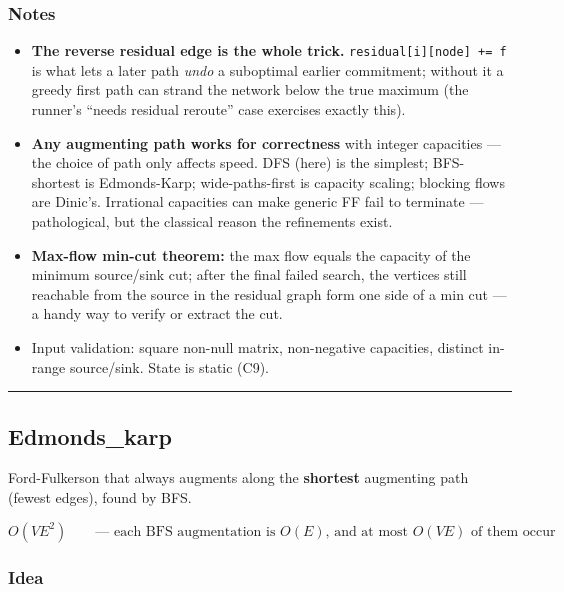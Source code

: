 \documentclass[
  10pt,
  letterpaper,
  onecolumn]{article}
\providecommand{\tightlist}{%
  \setlength{\itemsep}{0pt}\setlength{\parskip}{0pt}}
\begin{document}
\hypertarget{notes-23}{%
\subsubsection{Notes}\label{notes-23}}

\begin{itemize}
\tightlist
\item
  \textbf{The reverse residual edge is the whole trick.}
  \texttt{residual{[}i{]}{[}node{]}\ +=\ f} is what lets a later path
  \emph{undo} a suboptimal earlier commitment; without it a greedy first
  path can strand the network below the true maximum (the runner's
  ``needs residual reroute'' case exercises exactly this).
\item
  \textbf{Any augmenting path works for correctness} with integer
  capacities --- the choice of path only affects speed. DFS (here) is
  the simplest; BFS-shortest is Edmonds-Karp; wide-paths-first is
  capacity scaling; blocking flows are Dinic's. Irrational capacities
  can make generic FF fail to terminate --- pathological, but the
  classical reason the refinements exist.
\item
  \textbf{Max-flow min-cut theorem:} the max flow equals the capacity of
  the minimum source/sink cut; after the final failed search, the
  vertices still reachable from the source in the residual graph form
  one side of a min cut --- a handy way to verify or extract the cut.
\item
  Input validation: square non-null matrix, non-negative capacities,
  distinct in-range source/sink. State is static (C9).
\end{itemize}

\begin{center}\rule{0.5\linewidth}{0.5pt}\end{center}

\hypertarget{edmonds_karp}{%
\subsection{Edmonds\_karp}\label{edmonds_karp}}

Ford-Fulkerson that always augments along the \textbf{shortest}
augmenting path (fewest edges), found by BFS.

\begin{equation*}
O(V E^2)
\qquad\text{— each BFS augmentation is } O(E)\text{, and at most } O(VE) \text{ of them occur}
\end{equation*}

\hypertarget{idea-25}{%
\subsubsection{Idea}\label{idea-25}}
\end{document}
